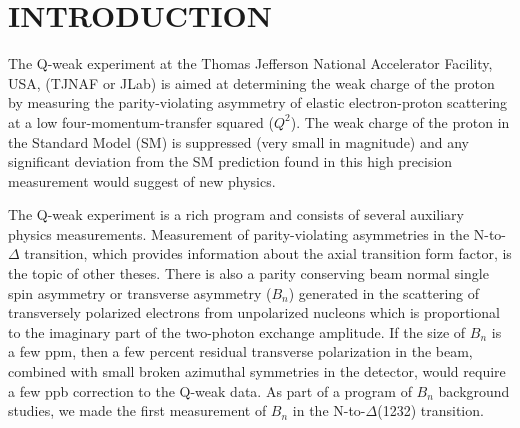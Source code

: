 \chapter{INTRODUCTION}
\label{INTRODUCTION}

The Q-weak experiment at the Thomas Jefferson National Accelerator Facility, USA, (TJNAF or JLab) is aimed at determining the weak charge of the proton by measuring the parity-violating asymmetry of elastic electron-proton scattering at a low four-momentum-transfer squared ($Q^{2}$). 
The weak charge of the proton in the Standard Model (SM) is suppressed (very small in magnitude) and any significant deviation from the SM prediction found in this high precision measurement would suggest of new physics.


The Q-weak experiment is a rich program and consists of several auxiliary physics measurements. Measurement of parity-violating asymmetries in the N-to-$\Delta$ transition, which provides information about the axial transition form factor, is the topic of other theses.
There is also a parity conserving beam normal single spin asymmetry or transverse asymmetry ($B_{n}$) generated in the scattering of transversely polarized electrons from unpolarized nucleons which is proportional to the imaginary part of the two-photon exchange amplitude. If the size of $B_{n}$ is a few ppm, then a few percent residual transverse polarization in the beam, combined with small broken azimuthal symmetries in the detector, would require a few ppb correction to the Q-weak data. As part of a program of $B_{n}$ background studies, we made the first measurement of $B_{n}$ in the N-to-$\Delta$(1232) transition.

